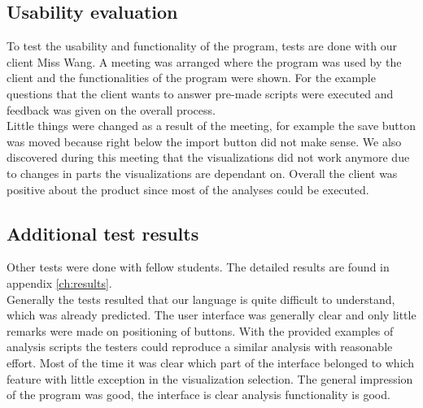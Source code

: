 \subsection{Usability evaluation}
To test the usability and functionality of the program, tests are done with our client Miss Wang. A meeting was arranged where the program was used by the client and the functionalities of the program were shown. For the example questions that the client wants to answer pre-made scripts were executed and feedback was given on the overall process.\\
Little things were changed as a result of the meeting, for example the save button was moved because right below the import button did not make sense. We also discovered during this meeting that the visualizations did not work anymore due to changes in parts the visualizations are dependant on. Overall the client was positive about the product since most of the analyses could be executed.
\subsection{Additional test results}
Other tests were done with fellow students. The detailed results are found in appendix \ref{ch:results}.\\
Generally the tests resulted that our language is quite difficult to understand, which was already predicted. The user interface was generally clear and only little remarks were made on positioning of buttons. With the provided examples of analysis scripts the testers could reproduce a similar analysis with reasonable effort. Most of the time it was clear which part of the interface belonged to which feature with little exception in the visualization selection. The general impression of the program was good, the interface is clear analysis functionality is good.